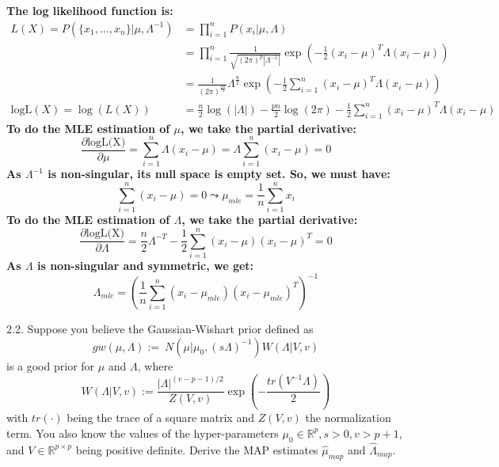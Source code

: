 \documentclass{article}
\theoremstyle{definition}
\theoremstyle{definition}
\theoremstyle{remark}
\begin{document}
\begin{addmargin}[3em]{2em}
  \textbf{The log likelihood function is:}
    \[
  \begin{split}
    L(X) = P(\{x_1, \dots, x_n\} | \mu, \Lambda^{-1}) & = \prod_{i=1}^{n} P(x_i | \mu, \Lambda) \\
    & = \prod_{i=1}^{n} \frac{1}{\sqrt{{(2\pi)}^p|\Lambda^{-1}|}} \exp(-\frac{1}{2} {(x_i - \mu)}^T \Lambda (x_i - \mu))\\
    & = \frac{1}{{(2\pi)}^{\frac{pn}{2}}} {\Lambda}^{\frac{n}{2}} \exp(-\frac{1}{2} \sum_{i=1}^n {(x_i - \mu)}^T \Lambda (x_i - \mu)) \\
    \mbox{logL}(X) = \log(L(X)) & = \frac{n}{2} \log(|\Lambda|) - \frac{pn}{2} \log(2\pi) - \frac{1}{2} \sum_{i=1}^n {(x_i - \mu)}^T \Lambda (x_i - \mu)
  \end{split}
  \]
  \textbf{To do the MLE estimation of $\mu$, we take the partial derivative:}
  \[
  \frac{\partial \mbox{logL(X)}}{\partial \mu} = \sum_{i=1}^n \Lambda (x_i - \mu) = \Lambda \sum_{i=1}^n (x_i - \mu) = 0  \]
  \textbf{As $\Lambda^{-1}$ is non-singular, its null space is empty set. So, we must have:}
  \[
  \sum_{i=1}^n (x_i - \mu) = 0 \leadsto \mu_{mle} = \frac{1}{n} \sum_{i=1}^n x_i
  \]
  \textbf{To do the MLE estimation of $\Lambda$, we take the partial derivative:}
  \[
  \frac{\partial \mbox{logL(X)}}{\partial \Lambda} = \frac{n}{2} \Lambda^{-T} - \frac{1}{2} \sum_{i=1}^n (x_i - \mu)(x_i - \mu)^T = 0
  \]
  \textbf{As $\Lambda$ is non-singular and symmetric, we get:}
  \[
  \Lambda_{mle} = {(\frac{1}{n} \sum_{i=1}^n (x_i - \mu_{mle}){(x_i - \mu_{mle})}^T)}^{-1}
  \]
\end{addmargin}

2.2. Suppose you believe the Gaussian-Wishart prior defined as
\begin{equation}
gw(\mu,\Lambda):= ~N(\mu|\mu_0,(s\Lambda)^{-1})W(\Lambda|V,v)
\end{equation}
is a good prior for $\mu$ and $\Lambda$, where
\begin{equation}
W(\Lambda|V,v) := \frac{|\Lambda|^{(v-p-1)/2}}{Z(V,v)} \exp \left(-\frac{tr(V^{-1}\Lambda)}{2} \right)
\end{equation}
with $tr(\cdot)$ being the trace of a square matrix and $Z(V,v)$ the normalization term. You also know the values of the hyper-parameters $\mu_0\in\mathbb{R}^p,s>0,v>p+1$, and $V\in\mathbb{R}^{p\times p}$ being positive definite. Derive the MAP estimates $\hat{\mu}_{map}$ and $\hat{\Lambda}_{map}$.
\end{document}

